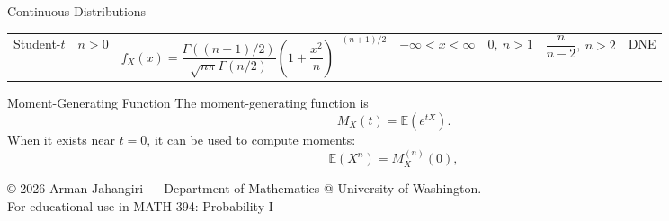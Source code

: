 \documentclass[11pt]{article}
\begin{document}
\begin{landscape}
\begin{distbox}{Continuous Distributions}
\begin{longtable}{L{2.3cm} L{2.4cm} L{5.2cm} C{2.4cm} C{2.2cm} C{2.4cm} L{4.4cm}}
Student-$t$
& $n>0$
& $f_X(x)=\dfrac{\Gamma((n+1)/2)}{\sqrt{n\pi}\Gamma(n/2)}
\left(1+\dfrac{x^2}{n}\right)^{-(n+1)/2}$
& $-\infty<x<\infty$
& $0,\ n>1$
& $\dfrac{n}{n-2},\ n>2$
& DNE
\\


\end{longtable}

\end{distbox}

\begin{distbox}{Moment-Generating Function}
The moment-generating function is
\[
M_X(t)=\mathbb{E}(e^{tX}).
\]
When it exists near $t=0$, it can be used to compute moments:
\[
\mathbb{E}(X^n)=M_X^{(n)}(0),
\]
\end{distbox}



\begin{center}
{\footnotesize
© 2026 Arman Jahangiri — Department of Mathematics @ University of Washington.\\
For educational use in MATH 394: Probability I
}
\end{center}



\end{landscape}





\vfill
\end{document}
